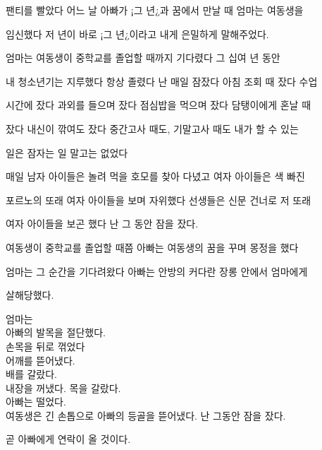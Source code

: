 팬티를 빨았다 어느 날 아빠가 ¡그 년¿과 꿈에서 만날 때 엄마는 여동생을

임신했다 저 년이 바로 ¡그 년¿이라고 내게 은밀하게 말해주었다.



엄마는 여동생이 중학교를 졸업할 때까지 기다렸다 그 십여 년 동안



내 청소년기는 지루했다 항상 졸렸다 난 매일 잠잤다 아침 조회 때 잤다 수업

시간에 잤다 과외를 들으며 잤다 점심밥을 먹으며 잤다 담탱이에게 혼날 때

잤다 내신이 깎여도 잤다 중간고사 때도, 기말고사 때도 내가 할 수 있는

일은 잠자는 일 말고는 없었다



매일 남자 아이들은 놀려 먹을 호모를 찾아 다녔고 여자 아이들은 색 빠진

포르노의 또래 여자 아이들을 보며 자위했다 선생들은 신문 건너로 저 또래

여자 아이들을 보곤 했다 난 그 동안 잠을 잤다.



여동생이 중학교를 졸업할 때쯤 아빠는 여동생의 꿈을 꾸며 몽정을 했다

엄마는 그 순간을 기다려왔다 아빠는 안방의 커다란 장롱 안에서 엄마에게

살해당했다.



엄마는\\

아빠의 발목을 절단했다.\\

손목을 뒤로 꺾었다\\

어깨를 뜯어냈다.\\

배를 갈랐다.\\

내장을 꺼냈다. 목을 갈랐다.\\

아빠는 떨었다.\\

여동생은 긴 손톱으로 아빠의 등골을 뜯어냈다. 난 그동안 잠을 잤다.



곧 아빠에게 연락이 올 것이다.

